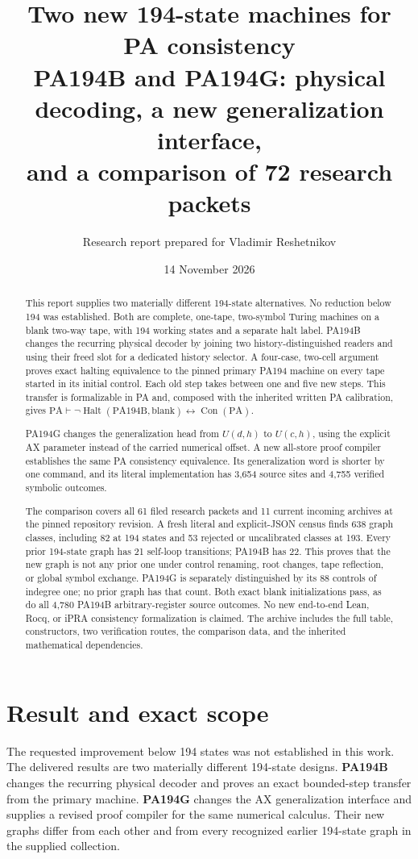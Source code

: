 \documentclass[11pt]{article}
\title{\textbf{Two new 194-state machines for PA consistency}\\[5pt]
\large PA194B and PA194G: physical decoding, a new generalization interface,\\
and a comparison of 72 research packets}
\author{Research report prepared for Vladimir Reshetnikov}
\date{14 November 2026}
\newcommand{\PA}{\mathrm{PA}}
\newcommand{\Con}{\operatorname{Con}}
\newcommand{\Halt}{\operatorname{Halt}}
\begin{document}
\maketitle
\begin{abstract}
This report supplies two materially different 194-state alternatives.
No reduction below 194 was established. Both are complete, one-tape,
two-symbol Turing machines on a blank two-way tape, with 194 working states
and a separate halt label. PA194B changes the recurring physical decoder by joining
two history-distinguished readers and using their freed slot for a dedicated
history selector. A four-case, two-cell argument proves exact halting
equivalence to the pinned primary PA194 machine on every tape started in
its initial control. Each old step takes between one and five new steps.
This transfer is formalizable in PA and, composed with the inherited
written PA calibration, gives
\(\PA\vdash\neg\Halt(\mathrm{PA194B},\mathrm{blank})
\leftrightarrow\Con(\PA)\).

PA194G changes the generalization head from $U(d,h)$ to $U(c,h)$, using
the explicit AX parameter instead of the carried numerical offset. A new
all-store proof compiler establishes the same PA consistency equivalence.
Its generalization word is shorter by one command, and its literal
implementation has 3,654 source sites and 4,755 verified symbolic outcomes.

The comparison covers all 61 filed research packets and 11 current incoming
archives at the pinned repository revision. A fresh literal and explicit-JSON
census finds 638 graph classes, including 82 at 194 states and 53 rejected
or uncalibrated classes at 193. Every prior 194-state graph has 21 self-loop
transitions; PA194B has 22. This proves that the new graph is not any prior
one under control renaming, root changes, tape reflection, or global symbol
exchange. PA194G is separately distinguished by its 88 controls of indegree
one; no prior graph has that count. Both exact blank initializations pass,
as do all 4,780 PA194B arbitrary-register source outcomes. No new end-to-end Lean, Rocq, or iPRA consistency
formalization is claimed. The archive includes the full table, constructors,
two verification routes, the comparison data, and the inherited mathematical
dependencies.
\end{abstract}
\newpage
\begingroup\small
\setlength{\parskip}{0pt}
\tableofcontents
\endgroup
\newpage

\section{Result and exact scope}
The requested improvement below 194 states was not established in this work.
The delivered results are two materially different 194-state designs.
\textbf{PA194B} changes the recurring physical decoder and proves an exact
bounded-step transfer from the primary machine. \textbf{PA194G} changes the
AX generalization interface and supplies a revised proof compiler for the
same numerical calculus. Their new graphs differ from each other and from
every recognized earlier 194-state graph in the supplied collection.
\end{document}
